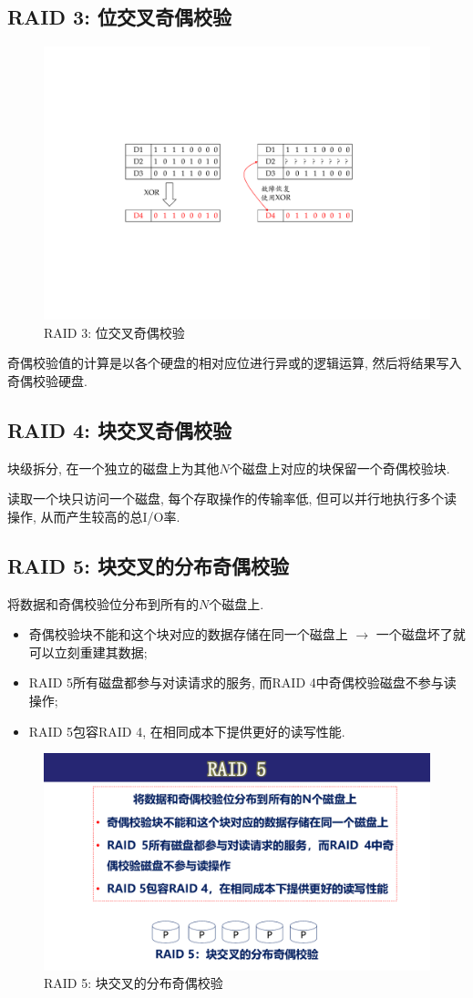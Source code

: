 \subsection{RAID 3: 位交叉奇偶校验}

\begin{figure}[H]
    \centering
    \includegraphics[width=.6\textwidth]{figure/RAID-3.pdf}
    \caption{RAID 3: 位交叉奇偶校验}
\end{figure}

奇偶校验值的计算是以各个硬盘的相对应位进行异或的逻辑运算, 然后将结果写入奇偶校验硬盘.

\subsection{RAID 4: 块交叉奇偶校验}

块级拆分, 在一个独立的磁盘上为其他$N$个磁盘上对应的块保留一个奇偶校验块.

读取一个块只访问一个磁盘, 每个存取操作的传输率低, 但可以并行地执行多个读操作, 从而产生较高的总I/O率.

\subsection{RAID 5: 块交叉的分布奇偶校验}

将数据和奇偶校验位分布到所有的$N$个磁盘上.
\begin{itemize}
    \item 奇偶校验块不能和这个块对应的数据存储在同一个磁盘上 $\to$ 一个磁盘坏了就可以立刻重建其数据;
    \item RAID 5所有磁盘都参与对读请求的服务, 而RAID 4中奇偶校验磁盘不参与读操作;
    \item RAID 5包容RAID 4, 在相同成本下提供更好的读写性能.
\end{itemize}

\begin{figure}[H]
    \centering
    \includegraphics[width=.4\textwidth]{figure/RAID-5.pdf}
    \caption{RAID 5: 块交叉的分布奇偶校验}
\end{figure}

